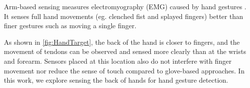 \documentclass{sigchi}
\begin{document}
Arm-based sensing measures electromyography (EMG) caused by hand gestures \cite{Myo, Saponas:2009:EAI:1622176.1622208}. It senses full hand movements (eg. clenched fist and splayed fingers) better than finer gestures such as moving a single finger.

As shown in \autoref{fig:HandTarget}, the back of the hand is closer to fingers, and the movement of tendons can be observed and sensed more clearly than at the wrists and forearm. Sensors placed at this location also do not interfere with finger movement nor reduce the sense of touch compared to glove-based approaches. In this work, we explore sensing the back of hands for hand gesture detection.



\end{document}

